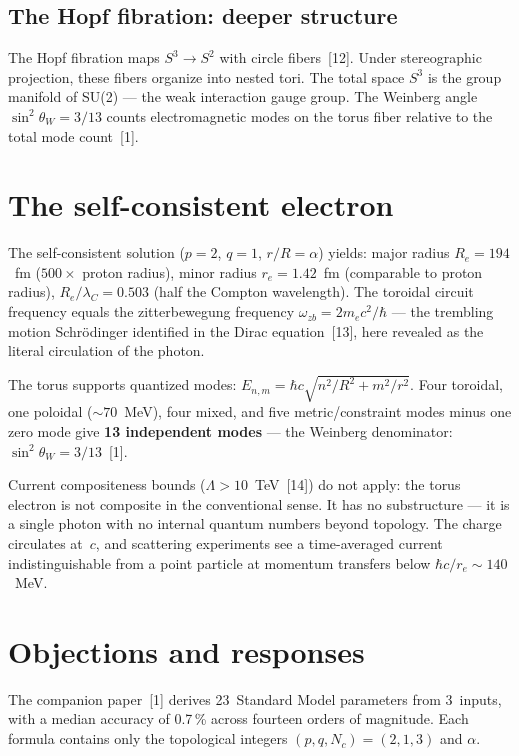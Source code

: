\documentclass[10pt,twoside,a5paper]{article}
\begin{document}
\subsection{The Hopf fibration: deeper structure}

The Hopf fibration maps $S^3 \to S^2$ with circle fibers~[12]. Under stereographic projection, these fibers organize into nested tori. The total space $S^3$ is the group manifold of SU(2) --- the weak interaction gauge group. The Weinberg angle $\sin^2\theta_W = 3/13$ counts electromagnetic modes on the torus fiber relative to the total mode count~[1].


\section{The self-consistent electron}

The self-consistent solution ($p = 2$, $q = 1$, $r/R = \alpha$) yields: major radius $R_e = 194$~fm ($500\times$ proton radius), minor radius $r_e = 1.42$~fm (comparable to proton radius), $R_e/\lambda_C = 0.503$ (half the Compton wavelength). The toroidal circuit frequency equals the zitterbewegung frequency $\omega_{zb} = 2m_e c^2/\hbar$ --- the trembling motion Schr\"odinger identified in the Dirac equation~[13], here revealed as the literal circulation of the photon.

The torus supports quantized modes: $E_{n,m} = \hbar c\sqrt{n^2/R^2 + m^2/r^2}$. Four toroidal, one poloidal ($\sim 70$~MeV), four mixed, and five metric/constraint modes minus one zero mode give \textbf{13 independent modes} --- the Weinberg denominator: $\sin^2\theta_W = 3/13$~[1].

Current compositeness bounds ($\Lambda > 10$~TeV~[14]) do not apply: the torus electron is not composite in the conventional sense. It has no substructure --- it is a single photon with no internal quantum numbers beyond topology. The charge circulates at~$c$, and scattering experiments see a time-averaged current indistinguishable from a point particle at momentum transfers below $\hbar c/r_e \sim 140$~MeV.


\section{Objections and responses}

The companion paper~[1] derives 23~Standard Model parameters from 3~inputs, with a median accuracy of 0.7\,\% across fourteen orders of magnitude. Each formula contains only the topological integers $(p,q,N_c) = (2,1,3)$ and $\alpha$.
\end{document}
